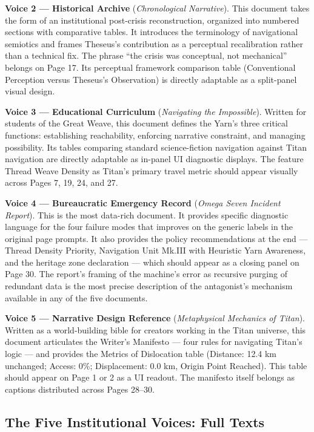 \documentclass[11pt]{article}
\begin{document}
\textbf{Voice 2 --- Historical Archive} (\textit{Chronological Narrative}).
This document takes the form of an institutional post-crisis reconstruction, organized into numbered sections with comparative tables. It introduces the terminology of navigational semiotics and frames Theseus's contribution as a perceptual recalibration rather than a technical fix. The phrase ``the crisis was conceptual, not mechanical'' belongs on Page 17. Its perceptual framework comparison table (Conventional Perception versus Theseus's Observation) is directly adaptable as a split-panel visual design.

\textbf{Voice 3 --- Educational Curriculum} (\textit{Navigating the Impossible}).
Written for students of the Great Weave, this document defines the Yarn's three critical functions: establishing reachability, enforcing narrative constraint, and managing possibility. Its tables comparing standard science-fiction navigation against Titan navigation are directly adaptable as in-panel UI diagnostic displays. The feature Thread Weave Density as Titan's primary travel metric should appear visually across Pages 7, 19, 24, and 27.

\textbf{Voice 4 --- Bureaucratic Emergency Record} (\textit{Omega Seven Incident Report}).
This is the most data-rich document. It provides specific diagnostic language for the four failure modes that improves on the generic labels in the original page prompts. It also provides the policy recommendations at the end --- Thread Density Priority, Navigation Unit Mk.III with Heuristic Yarn Awareness, and the heritage zone declaration --- which should appear as a closing panel on Page 30. The report's framing of the machine's error as recursive purging of redundant data is the most precise description of the antagonist's mechanism available in any of the five documents.

\textbf{Voice 5 --- Narrative Design Reference} (\textit{Metaphysical Mechanics of Titan}).
Written as a world-building bible for creators working in the Titan universe, this document articulates the Writer's Manifesto --- four rules for navigating Titan's logic --- and provides the Metrics of Dislocation table (Distance: 12.4 km unchanged; Access: 0\%; Displacement: 0.0 km, Origin Point Reached). This table should appear on Page 1 or 2 as a UI readout. The manifesto itself belongs as captions distributed across Pages 28--30.

\subsection{The Five Institutional Voices: Full Texts}
\end{document}
